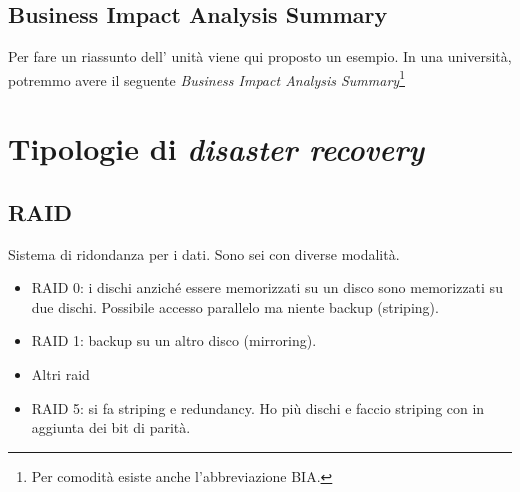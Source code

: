 \subsection{Business Impact Analysis Summary}

Per fare un riassunto dell' unità viene qui proposto un esempio. In una 
università, potremmo avere il seguente \textit{Business Impact Analysis 
Summary}\footnote{Per comodità esiste anche l'abbreviazione BIA.}

\begin{table}[H]
\centering
{}
\caption{Un esempio di BIA per una Università}
\end{table}


\section{Tipologie di \textit{disaster recovery}}

\subsection{RAID}

Sistema di ridondanza per i dati. Sono sei con diverse modalità.
\begin{itemize}
  \item RAID 0: i dischi anziché essere memorizzati su un disco sono 
  memorizzati su due dischi. Possibile accesso parallelo ma niente backup 
  (striping).
  
  \item RAID 1: backup su un altro disco (mirroring).
  
  \item Altri raid
  
  \item RAID 5: si fa striping e redundancy. Ho più dischi e faccio striping 
  con in aggiunta dei bit di parità.
  
\end{itemize}

